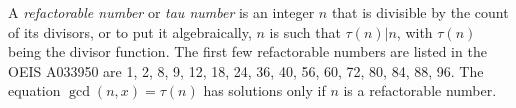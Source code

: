 \documentclass[12pt]{article}
\begin{document}
A {\em refactorable number} or {\em tau number} is an integer $n$ that is divisible by the count of its divisors, or to put it algebraically, $n$ is such that $\tau(n)|n$, with $\tau(n)$ being the divisor function. The first few refactorable numbers are listed in the OEIS A033950 are 1, 2, 8, 9, 12, 18, 24, 36, 40, 56, 60, 72, 80, 84, 88, 96. The equation $\gcd(n, x) = \tau(n)$ has solutions only if $n$ is a refactorable number.
\end{document}
